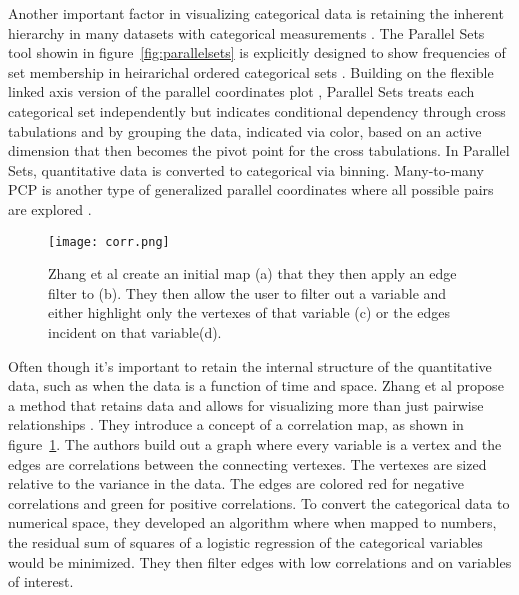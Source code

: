 \documentclass[../main.text]{subfiles}
\begin{document}
Another important factor in visualizing categorical data is retaining the
inherent hierarchy in many datasets with categorical measurements
\cite{shneiderman_visualizing_2000}. The Parallel Sets tool
showin in figure~\ref{fig:parallelsets} is explicitly designed to show frequencies
of set membership in heirarichal ordered categorical sets \cite{kosara_parallel_2006}. Building on the flexible linked axis version of
  the parallel coordinates plot \cite{claessen_flexible_2011}, Parallel Sets
  treats each categorical set independently but indicates conditional
  dependency through cross tabulations and by grouping the data, indicated via
  color, based on an active dimension that then becomes the pivot point for the
  cross tabulations. In Parallel Sets, quantitative data is converted to
  categorical via binning. Many-to-many PCP is another type of generalized
  parallel coordinates where all possible pairs are explored \cite{lind_many--many_2009}. 

\begin{figure}
  \texttt{[image: corr.png]}
  \caption{Zhang et al create an initial map (a) that they then apply an
  edge filter to (b). They then allow the user to filter out a variable and
  either highlight only the vertexes of that variable (c) or the edges incident
  on that variable(d).}
  \label{fig:corr}
\end{figure}

Often though it's important to retain the internal structure of the
quantitative data, such as when the data is a function of time and
space. Zhang et al propose a method that retains data and allows for
visualizing more than just pairwise relationships \cite{zhang_visual_2015}. They
introduce a concept of a correlation map, as shown in
figure~\ref{fig:corr}. The authors build out a graph where every variable is a
vertex and the edges are correlations between the connecting vertexes. The
vertexes are sized relative to the variance in the data. The edges are colored
red for negative correlations and green for positive correlations. To convert
the categorical data to numerical space, they developed an algorithm where when
mapped to numbers, the residual sum of squares of a logistic regression of the
categorical variables  would be minimized. They then filter edges with low
correlations and on variables of interest.
\end{document}
